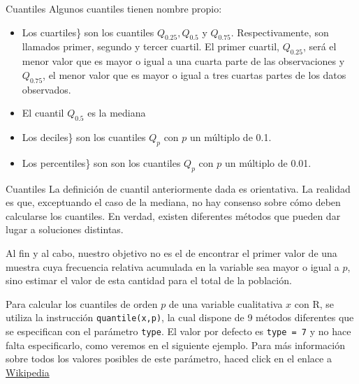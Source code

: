 \documentclass[
  ignorenonframetext,
  aspectratio=169]{beamer}
\providecommand{\tightlist}{%
  \setlength{\itemsep}{0pt}\setlength{\parskip}{0pt}}
\begin{document}
\begin{frame}{Cuantiles}
\label{cuantiles}
Algunos cuantiles tienen nombre propio:

\begin{itemize}
\tightlist
\item
  Los cuartiles\} son los cuantiles \(Q_{0.25},Q_{0.5}\) y \(Q_{0.75}\).
  Respectivamente, son llamados primer, segundo y tercer cuartil. El
  primer cuartil, \(Q_{0.25}\), será el menor valor que es mayor o igual
  a una cuarta parte de las observaciones y \(Q_{0.75}\), el menor valor
  que es mayor o igual a tres cuartas partes de los datos observados.
\item
  El cuantil \(Q_{0.5}\) es la mediana
\item
  Los deciles\} son los cuantiles \(Q_p\) con \(p\) un múltiplo de 0.1.
\item
  Los percentiles\} son son los cuantiles \(Q_p\) con \(p\) un múltiplo
  de 0.01.
\end{itemize}
\end{frame}

\begin{frame}[fragile]{Cuantiles}
\label{cuantiles-1}
La definición de cuantil anteriormente dada es orientativa. La realidad
es que, exceptuando el caso de la mediana, no hay consenso sobre cómo
deben calcularse los cuantiles. En verdad, existen diferentes métodos
que pueden dar lugar a soluciones distintas.

Al fin y al cabo, nuestro objetivo no es el de encontrar el primer valor
de una muestra cuya frecuencia relativa acumulada en la variable sea
mayor o igual a \(p\), sino estimar el valor de esta cantidad para el
total de la población.

Para calcular los cuantiles de orden \(p\) de una variable cualitativa
\(x\) con R, se utiliza la instrucción \texttt{quantile(x,p)}, la cual
dispone de 9 métodos diferentes que se especifican con el parámetro
\texttt{type}. El valor por defecto es \texttt{type\ =\ 7} y no hace
falta especificarlo, como veremos en el siguiente ejemplo. Para más
información sobre todos los valores posibles de este parámetro, haced
click en el enlace a
\href{https://es.wikipedia.org/wiki/Cuantil}{Wikipedia}
\end{frame}
\end{document}
